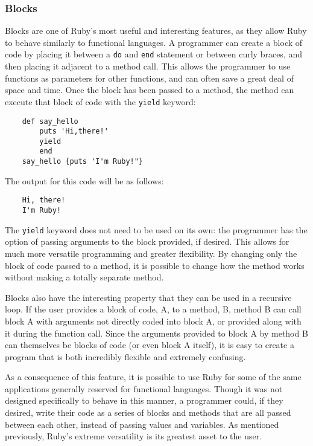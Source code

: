 \documentclass[12pt]{article}
\begin{document}
\subsubsection{Blocks}
Blocks are one of Ruby's most useful and interesting features, as they allow Ruby to behave similarly to functional languages. A programmer can create a block of code by placing it between a \verb|do| and \verb|end| statement or between curly braces, and then placing it adjacent to a method call. This allows the programmer to use functions as parameters for other functions, and can often save a great deal of space and time.
Once the block has been passed to a method, the method can execute that block of code with the \verb|yield| keyword:
\begin {lstlisting}
	def say_hello
		puts 'Hi,there!'
    	yield
    	end
	say_hello {puts 'I'm Ruby!"}
\end{lstlisting}
The output for this code will be as follows:
\begin{verbatim}
    Hi, there!
    I'm Ruby!
\end{verbatim}
The \verb|yield| keyword does not need to be used on its own: the programmer has the option of passing arguments to the block provided, if desired. This allows for much more versatile programming and greater flexibility. By changing only the block of code passed to a method, it is possible to change how the method works without making a totally separate method.

Blocks also have the interesting property that they can be used in a recursive loop. If the user provides a block of code, A, to a method, B, method B can call block A with arguments not directly coded into block A, or provided along with it during the function call. Since the arguments provided to block A by method B can themselves be blocks of code (or even block A itself), it is easy to create a program that is both incredibly flexible and extremely confusing.

As a consequence of this feature, it is possible to use Ruby for some of the same applications generally reserved for functional languages. Though it was not designed specifically to behave in this manner, a programmer could, if they desired, write their code as a series of blocks and methods that are all passed between each other, instead of passing values and variables. As mentioned previously, Ruby's extreme versatility is its greatest asset to the user.
\end{document}

